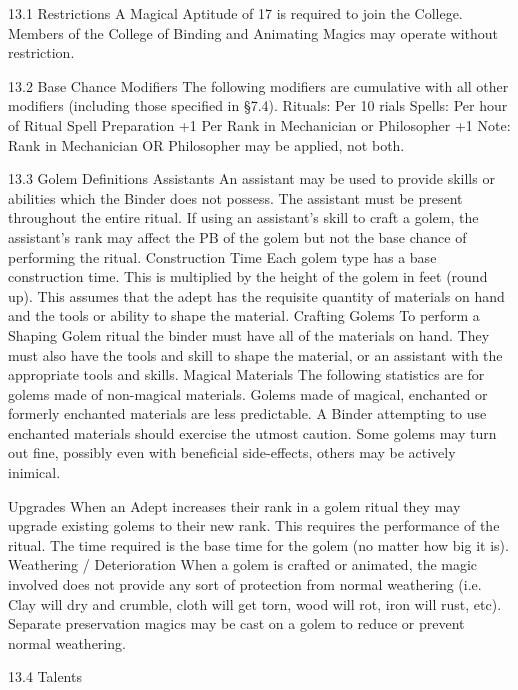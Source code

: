 \documentclass[a4paper]{article}
\begin{document}
\begin{multicols}{3}
13.1 Restrictions
A Magical Aptitude of 17 is required to join the
College. Members of the College of Binding and
Animating Magics may operate without restriction.

13.2 Base Chance Modifiers
The following modifiers are cumulative with all
other modifiers (including those specified in §7.4).
Rituals: Per 10%
rials
Spells: Per hour of Ritual Spell Preparation
+1
Per Rank in Mechanician or Philosopher
+1
Note: Rank in Mechanician OR Philosopher may
be applied, not both.

13.3 Golem Definitions
Assistants An assistant may be used to provide
skills or abilities which the Binder does not possess. The assistant must be present throughout the
entire ritual. If using an assistant’s skill to craft a
golem, the assistant’s rank may affect the PB of the
golem but not the base chance of performing the
ritual.
Construction Time Each golem type has a base
construction time. This is multiplied by the height
of the golem in feet (round up). This assumes that
the adept has the requisite quantity of materials on
hand and the tools or ability to shape the material.
Crafting Golems To perform a Shaping Golem
ritual the binder must have all of the materials on
hand. They must also have the tools and skill to
shape the material, or an assistant with the appropriate tools and skills.
Magical Materials The following statistics are for
golems made of non-magical materials. Golems
made of magical, enchanted or formerly enchanted
materials are less predictable. A Binder attempting
to use enchanted materials should exercise the
utmost caution. Some golems may turn out fine,
possibly even with beneficial side-effects, others
may be actively inimical.

Upgrades When an Adept increases their rank in a
golem ritual they may upgrade existing golems to
their new rank. This requires the performance of
the ritual. The time required is the base time for the
golem (no matter how big it is).
Weathering / Deterioration When a golem is
crafted or animated, the magic involved does not
provide any sort of protection from normal weathering (i.e. Clay will dry and crumble, cloth will get
torn, wood will rot, iron will rust, etc). Separate
preservation magics may be cast on a golem to
reduce or prevent normal weathering.

13.4 Talents


\end{multicols}
\end{document}
